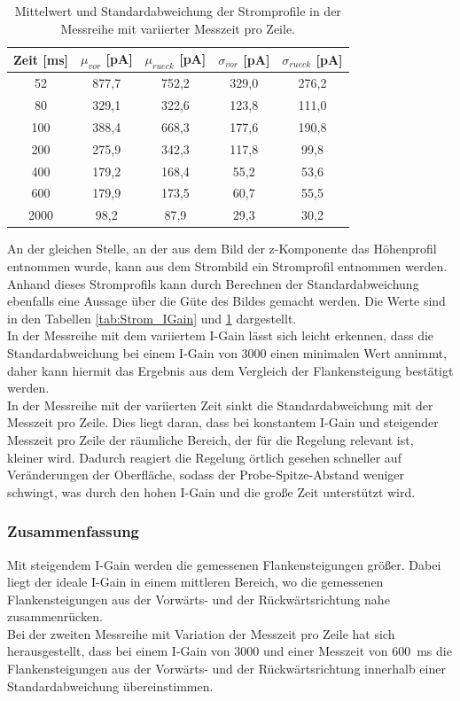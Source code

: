 \documentclass[12pt,a4paper]{article}
\begin{document}
\begin{table}
\centering
\begin{tabular}{|c|c|c|c|c|}
\hline 
Zeit [ms] & $\mu_{vor}$ [pA] & $\mu_{rueck}$ [pA] & $\sigma_{vor}$ [pA] & $\sigma_{rueck}$ [pA] \\ 
\hline 
52 & 877,7 & 752,2 & 329,0 & 276,2 \\
\hline 
80 & 329,1 & 322,6 & 123,8 & 111,0 \\ 
\hline 
100 & 388,4 & 668,3 & 177,6 & 190,8 \\
\hline 
200 & 275,9 & 342,3 & 117,8 & 99,8 \\
\hline 
400 & 179,2 & 168,4 & 55,2 & 53,6 \\
\hline 
600 & 179,9 & 173,5 & 60,7 & 55,5 \\
\hline 
2000 & 98,2 & 87,9 & 29,3 & 30,2 \\
\hline 
\end{tabular} 
\caption{Mittelwert und Standardabweichung der Stromprofile in der Messreihe mit variierter Messzeit pro Zeile.}
\label{tab:Strom_Zeit}
\end{table}

An der gleichen Stelle, an der aus dem Bild der z-Komponente das Höhenprofil entnommen wurde, kann aus dem Strombild ein Stromprofil entnommen werden. Anhand dieses Stromprofils kann durch Berechnen der Standardabweichung ebenfalls eine Aussage über die Güte des Bildes gemacht werden. Die Werte sind in den Tabellen \ref{tab:Strom_IGain} und \ref{tab:Strom_Zeit} dargestellt. \\
In der Messreihe mit dem variiertem I-Gain lässt sich leicht erkennen, dass die Standardabweichung bei einem I-Gain von 3000 einen minimalen Wert annimmt, daher kann hiermit das Ergebnis aus dem Vergleich der Flankensteigung bestätigt werden.\\
In der Messreihe mit der variierten Zeit sinkt die Standardabweichung mit der Messzeit pro Zeile. Dies liegt daran, dass bei konstantem I-Gain und steigender Messzeit pro Zeile der räumliche Bereich, der für die Regelung relevant ist, kleiner wird. Dadurch reagiert die Regelung örtlich gesehen schneller auf Veränderungen der Oberfläche, sodass der Probe-Spitze-Abstand weniger schwingt, was durch den hohen I-Gain und die große Zeit unterstützt wird.

\subsubsection{Zusammenfassung}
Mit steigendem I-Gain werden die gemessenen Flankensteigungen größer. Dabei liegt der ideale I-Gain in einem mittleren Bereich, wo die gemessenen Flankensteigungen aus der Vorwärts- und der Rückwärtsrichtung nahe zusammenrücken. \\
Bei der zweiten Messreihe mit Variation der Messzeit pro Zeile hat sich herausgestellt, dass bei einem I-Gain von 3000 und einer Messzeit von \SI{600}{ms} die Flankensteigungen aus der Vorwärts- und der Rückwärtsrichtung innerhalb einer Standardabweichung übereinstimmen.
\end{document}
